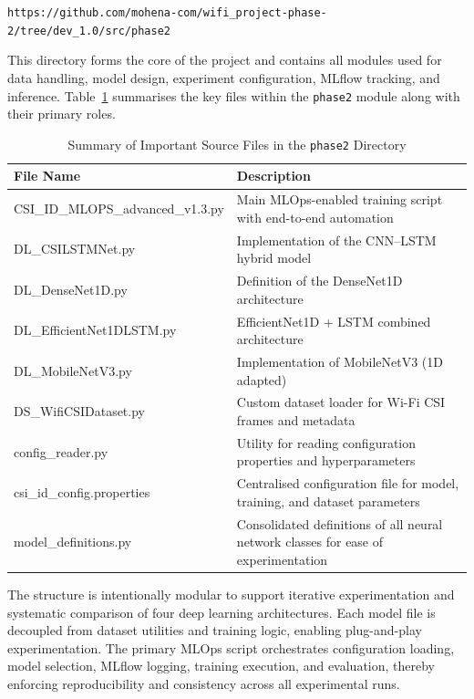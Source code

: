 \begin{center}
\texttt{https://github.com/mohena-com/wifi\_project-phase-2/tree/dev\_1.0/src/phase2}
\end{center}

This directory forms the core of the project and contains all modules used for data handling, model design, 
experiment configuration, MLflow tracking, and inference. Table~\ref{tab:phase2files} summarises the 
key files within the \texttt{phase2} module along with their primary roles.



\begin{table}[H]
\centering
\caption{Summary of Important Source Files in the \texttt{phase2} Directory}
\label{tab:phase2files}
\begin{tabularx}{0.95\textwidth}{|l|X|}
\hline
\textbf{File Name} & \textbf{Description} \\ \hline

CSI\_ID\_MLOPS\_advanced\_v1.3.py 
& Main MLOps-enabled training script with end-to-end automation \\ \hline

DL\_CSILSTMNet.py 
& Implementation of the CNN--LSTM hybrid model \\ \hline

DL\_DenseNet1D.py 
& Definition of the DenseNet1D architecture \\ \hline

DL\_EfficientNet1DLSTM.py 
& EfficientNet1D + LSTM combined architecture \\ \hline

DL\_MobileNetV3.py 
& Implementation of MobileNetV3 (1D adapted) \\ \hline

DS\_WifiCSIDataset.py 
& Custom dataset loader for Wi-Fi CSI frames and metadata \\ \hline

config\_reader.py 
& Utility for reading configuration properties and hyperparameters \\ \hline

csi\_id\_config.properties 
& Centralised configuration file for model, training, and dataset parameters \\ \hline

model\_definitions.py 
& Consolidated definitions of all neural network classes for ease of experimentation \\ \hline

\end{tabularx}
\end{table}


The structure is intentionally modular to support iterative experimentation and systematic comparison of four 
deep learning architectures. Each model file is decoupled from dataset utilities and training logic, enabling 
plug-and-play experimentation. The primary MLOps script orchestrates configuration loading, model selection, 
MLflow logging, training execution, and evaluation, thereby enforcing reproducibility and consistency across 
all experimental runs.
